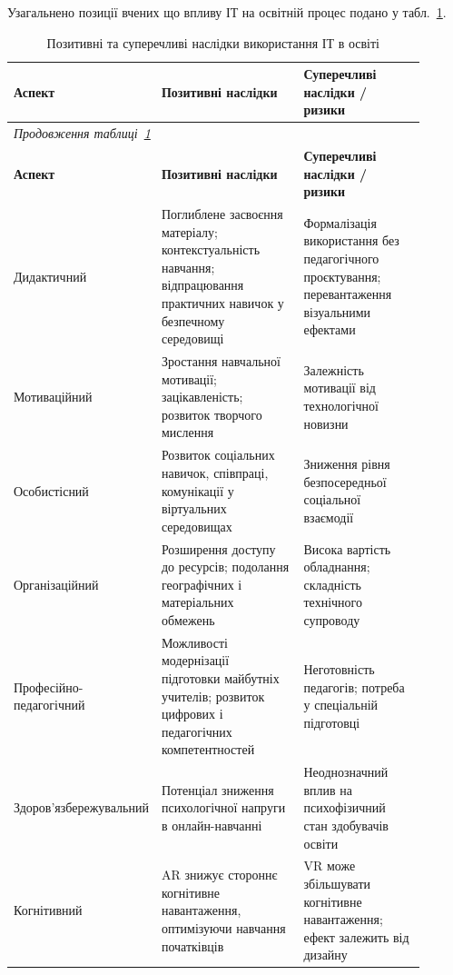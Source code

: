 Узагальнено позиції вчених що впливу ІТ на освітній процес подано у табл.~\ref{tab:iot_effects}.

{%
\begin{longtable}{|p{0.20\linewidth}|p{0.38\linewidth}|p{0.32\linewidth}|}
\caption{Позитивні та суперечливі наслідки використання ІТ в освіті}\label{tab:iot_effects}\\
\hline
\textbf{Аспект} & \textbf{Позитивні наслідки} & \textbf{Суперечливі наслідки / ризики} \\
\hline
\endfirsthead
\multicolumn{3}{l}{\textit{Продовження таблиці~\ref{tab:iot_effects}}}\\
\hline
\textbf{Аспект} & \textbf{Позитивні наслідки} & \textbf{Суперечливі наслідки / ризики} \\
\hline
\endhead
\hline
\endfoot
Дидактичний & Поглиблене засвоєння матеріалу; контекстуальність навчання; відпрацювання практичних навичок у безпечному середовищі~\cite{Radianti2020VR, Dalgarno2010What} & Формалізація використання без педагогічного проєктування; перевантаження візуальними ефектами \\
\hline
Мотиваційний & Зростання навчальної мотивації; зацікавленість; розвиток творчого мислення~\cite{Angelov2025Synergy, KMotivation2023} & Залежність мотивації від технологічної новизни \\
\hline
Особистісний & Розвиток соціальних навичок, співпраці, комунікації у віртуальних середовищах~\cite{DiNatale2020Immersive} & Зниження рівня безпосередньої соціальної взаємодії \\
\hline
Організаційний & Розширення доступу до ресурсів; подолання географічних і матеріальних обмежень~\cite{Radianti2020VR} & Висока вартість обладнання; складність технічного супроводу \\
\hline
Професійно-педагогічний & Можливості модернізації підготовки майбутніх учителів; розвиток цифрових і педагогічних компетентностей~\cite{Angelov2025Synergy} & Неготовність педагогів; потреба у спеціальній підготовці \\
\hline
Здоров'язбе\-режувальний & Потенціал зниження психологічної напруги в онлайн-навчанні~\cite{Krokos2019Virtual} & Неоднозначний вплив на психофізичний стан здобувачів освіти~\cite{Parong2021Cognitive} \\
\hline
Когнітивний & AR знижує стороннє когнітивне навантаження, оптимізуючи навчання початківців~\cite{Poupard2024Systematic, Buchner2021CogLoad} & VR може збільшувати когнітивне навантаження; ефект залежить від дизайну~\cite{Parong2021Cognitive, Mulders2020Framework} \\
\hline
\end{longtable}
}

